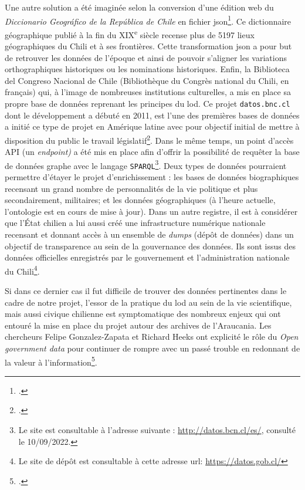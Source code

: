 	Une autre solution a été imaginée selon la conversion d'une édition web du \textit{Diccionario Geográfico de la República de Chile} en fichier \gls{json}\footcite{solanoasta-buruagaDiccionarioGeograficoRepublica1899}. Ce dictionnaire géographique publié à la fin du XIX\textsuperscript{e} siècle recense plus de 5197 lieux géographiques du Chili et à ses frontières. Cette transformation \gls{json} a pour but de retrouver les données de l'époque et ainsi de pouvoir s'aligner les variations orthographiques historiques ou les nominations historiques.\newpar
	Enfin, la Biblioteca del Congreso Nacional de Chile (Bibliothèque du Congrès national du Chili, en français) qui, à l'image de nombreuses institutions culturelles, a mis en place sa propre base de données reprenant les principes du \gls{lod}. Ce projet \texttt{datos.bnc.cl} dont le développement a débuté en 2011, est l'une des premières bases de données a initié ce type de projet en Amérique latine avec pour objectif initial de mettre à disposition du public le travail législatif\footcite{cifuentes-silvaArchitectureAdoptionProcess2011}. Dans le même temps, un point d'accès API (un \textit{endpoint)} a été mis en place afin d'offrir la possibilité de requêter la base de données graphe avec le langage \texttt{SPARQL}\footnote{Le site est consultable à l'adresse suivante : \url{http://datos.bcn.cl/es/}, consulté le 10/09/2022.}. Deux types de données pourraient permettre d'étayer le projet d'enrichissement : les bases de données biographiques recensant un grand nombre de personnalités de la vie politique et plus secondairement, militaires; et les données géographiques (à l'heure actuelle, l'ontologie est en cours de mise à jour). Dans un autre registre, il est à considérer que l'État chilien a lui aussi créé une infrastructure numérique nationale recensant et donnant accès à un ensemble de \textit{dumps} (dépôt de données) dans un objectif de transparence au sein de la gouvernance des données. Ils sont issus des données officielles enregistrés par le gouvernement et l'administration nationale du Chili\footnote{Le site de dépôt est consultable à cette adresse url: \url{https://datos.gob.cl/}}.
	
	Si dans ce dernier cas il fut difficile de trouver des données pertinentes dans le cadre de notre projet, l'essor de la pratique du \gls{lod} au sein de la vie scientifique, mais aussi civique chilienne est symptomatique des nombreux enjeux qui ont entouré la mise en place du projet autour des archives de l'Araucania. Les chercheurs Felipe Gonzalez-Zapata et Richard Heeks ont explicité le rôle du \textit{Open government data} pour continuer de rompre avec un passé trouble en redonnant de la valeur à l'information\footcite{gonzalez-zapataMultipleMeaningsOpen2015}.